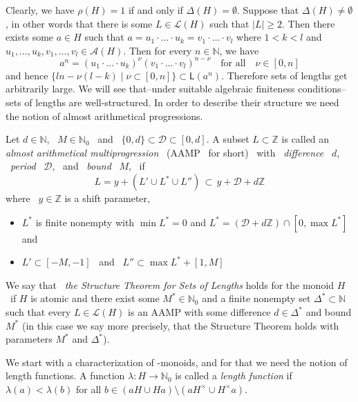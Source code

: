 \documentclass[a4paper]{amsart}
\theoremstyle{definition}
\numberwithin{equation}{section}
\begin{document}
Clearly, we have $\rho (H) = 1$ if and only if $\Delta (H) =
\emptyset$. Suppose that $\Delta (H) \ne \emptyset$, in other words
that there is some $L \in \mathcal L (H)$ such that $|L| \ge 2$.
Then there exists some $a \in H$ such that $a = u_1 \cdot \ldots
\cdot u_k = v_1 \cdot \ldots \cdot v_l$ where $1 < k < l$ and $u_1,
\ldots, u_k, v_1, \ldots, v_l \in \mathcal A (H)$. Then for every $n
\in \mathbb N$, we have
\[
a^n = (u_1 \cdot \ldots \cdot u_k)^{\nu}(v_1 \cdot \ldots \cdot
v_l)^{n - \nu} \quad \text{for all} \quad \nu \in [0, n]
\]
and hence $\{ln - \nu(l-k) \mid \nu \subset [0,n] \} \subset \mathsf
L (a^n)$. Therefore sets of lengths get arbitrarily large. We will
see that--under suitable algebraic finiteness conditions--sets of
lengths are well-structured. In order to describe their structure we
need the notion of almost arithmetical progressions.

Let $d \in {\mathbb N}$, \ $M \in {\mathbb N}_0$ \ and \ $\{0,d\} \subset \mathcal D
\subset [0,d]$. A subset $L \subset {\mathbb Z}$ is called an {\it almost
arithmetical multiprogression} \ ({\rm AAMP} \ for
      short) \ with \ {\it difference} \ $d$, \ {\it period} \ $\mathcal D$,
      \  and \ {\it bound} \ $M$, \ if
\[
L = y + (L' \cup L^* \cup L'') \, \subset \, y + \mathcal D + d {\mathbb Z}
\]
where \ $y \in \mathbb Z$ is a shift parameter,
\begin{itemize}
\item  $L^*$ is finite nonempty with $\min L^* = 0$ and $L^* =
       (\mathcal D + d {\mathbb Z}) \cap [0, \max L^*]$ and

\item  $L' \subset [-M, -1]$ \ and \ $L'' \subset \max L^* + [1,M]$
\end{itemize}

\smallskip
We say that \ {\it the Structure Theorem for Sets of Lengths} holds
for the monoid $H$ \ if $H$ is atomic and there exist some $M^* \in
{\mathbb N}_0$ and a finite nonempty set $\Delta^* \subset {\mathbb N}$ such that
every $L \in \mathcal L(H)$ is an {\rm AAMP} with some difference $d
\in \Delta^*$ and bound $M^*$ (in this case we say more precisely,
that the Structure Theorem holds with parameters $M^*$ and
$\Delta^*$).

\medskip
We start with a characterization of {}-monoids, and for that we
need the notion of length functions. A function $\lambda \colon H
\to \mathbb N_0$ is called a {\it length function} if $\lambda (a) <
\lambda (b)$ for all $b \in (aH \cup Ha) \setminus (aH^{\times} \cup
H^{\times}a)$.
\end{document}
